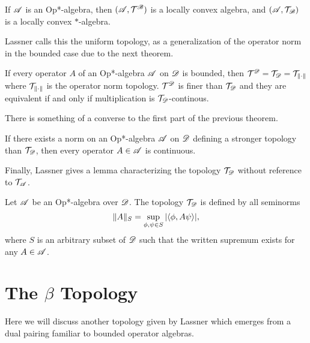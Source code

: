 \documentclass[../main.tex]{subfiles}
\begin{document}
\begin{theorem}

If $\mathscr{A}$ is an Op*-algebra, then $(\mathscr{A}, \mathcal{T}^\mathscr{B})$ is a locally convex algebra, and $(\mathscr{A}, \mathcal{T}_\mathscr{B})$ is a locally
convex $\ast$-algebra.

\end{theorem}

Lassner calls this the uniform topology, as a generalization of the operator norm in the bounded case due to the next theorem.

\begin{theorem}

	If every operator $A$ of an Op*-algebra $\mathscr{A}$ on $\mathscr{D}$ is bounded, then $\mathcal{T}^\mathscr{D} = \mathcal{T}_\mathscr{D} = \mathcal{T}_{\left\lVert\cdot\right\rVert}$
	where $\mathcal{T}_{\left\lVert\cdot\right\rVert}$ is the operator norm topology. $\mathcal{T}^\mathscr{D}$ is finer than $\mathcal{T}_\mathscr{D}$ and they are equivalent if and 
	only if multiplication is $\mathcal{T}_\mathscr{D}$-continous.

\end{theorem}


There is something of a converse to the first part of the previous theorem.

\begin{theorem}

If there exists a norm on an Op*-algebra $\mathscr{A}$ on $\mathscr{D}$ defining a stronger topology than $\mathcal{T}_\mathscr{D}$, then every operator $A \in \mathscr{A}$
is continuous.

\end{theorem}

Finally, Lassner gives a lemma characterizing the topology $\mathcal{T}_\mathscr{D}$ without reference to $\mathcal{T}_\mathscr{A}$.

\begin{lemma}

	Let $\mathscr{A}$ be an Op*-algebra over $\mathscr{D}$. The topology $\mathcal{T}_\mathscr{D}$ is defined by all seminorms 
	\[\|A\|_S = \sup_{\phi, \psi \in S}|\langle \phi, A\psi \rangle|,\] where $S$ is an arbitrary subset of $\mathscr{D}$ such that
	the written supremum exists for any $A \in \mathscr{A}$.


\end{lemma}


\section*{The $\beta$ Topology}

Here we will discuss another topology given by Lassner which emerges from a dual pairing familiar to
bounded operator algebras.
\end{document}
